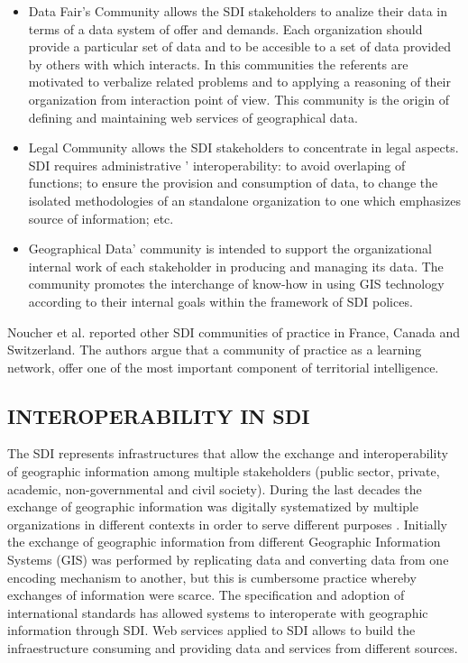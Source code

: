 \documentclass[10pt,twocolumn,ieeetran]{article}
\begin{document}
\begin{itemize}
\item Data Fair's Community allows the SDI stakeholders to analize their data in terms of a data system of offer and demands. Each organization should provide a particular set of data and to be accesible to a set of data provided by others with which interacts. In this communities the referents are motivated to verbalize related problems and to applying a reasoning of their organization from interaction point of view. This community is the origin of defining and maintaining web services of geographical data.
 
\item Legal Community allows the SDI stakeholders to concentrate in legal aspects. SDI requires administrative ' interoperability: to avoid overlaping of functions; to ensure the provision and consumption of data, to change the isolated methodologies of an standalone organization to one which emphasizes source of information; etc.
\item Geographical Data' community is intended to support the organizational internal work of each stakeholder in producing and managing its data. The community promotes the interchange of know-how in using GIS technology according to their internal goals within the framework of SDI polices.
\end{itemize}

Noucher et al. \cite{Noucher2} reported other SDI communities of practice in France, Canada and Switzerland.
The authors \cite{Noucher1} argue that a community of practice as a learning network, offer one of the most important component of territorial intelligence.

\subsection{INTEROPERABILITY IN SDI}

The SDI represents infrastructures that allow the exchange and interoperability of geographic information among multiple stakeholders (public sector, private, academic, non-governmental and civil society). During the last decades the exchange of geographic information was digitally systematized by multiple organizations in different contexts in order to serve different purposes \cite{Delgado} \cite{Georgiadou}.
Initially the exchange of geographic information from different Geographic Information Systems (GIS) was performed by replicating data and converting data from one encoding mechanism to another, but this is cumbersome practice whereby exchanges of information were scarce. The specification and adoption of international standards has allowed systems to interoperate with geographic information through SDI.
Web services applied to SDI allows to build the infraestructure consuming and providing data and services from different sources.
\end{document}
